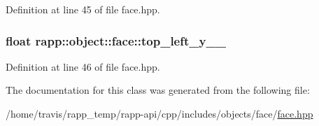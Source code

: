 Definition at line 45 of file face.\-hpp.

\hypertarget{classrapp_1_1object_1_1face_a49bd8f68f0c9a4a6dd14c315edc72d50}{
\subsubsection[{top\-\_\-left\-\_\-y\-\_\-\-\_\-}]{\setlength{\rightskip}{0pt plus 5cm}float rapp\-::object\-::face\-::top\-\_\-left\-\_\-y\-\_\-\-\_\-\hspace{0.3cm}{\ttfamily [private]}}}\label{classrapp_1_1object_1_1face_a49bd8f68f0c9a4a6dd14c315edc72d50}


Definition at line 46 of file face.\-hpp.



The documentation for this class was generated from the following file\-:\begin{DoxyCompactItemize}
\item 
/home/travis/rapp\-\_\-temp/rapp-\/api/cpp/includes/objects/face/\hyperlink{face_8hpp}{face.\-hpp}\end{DoxyCompactItemize}
